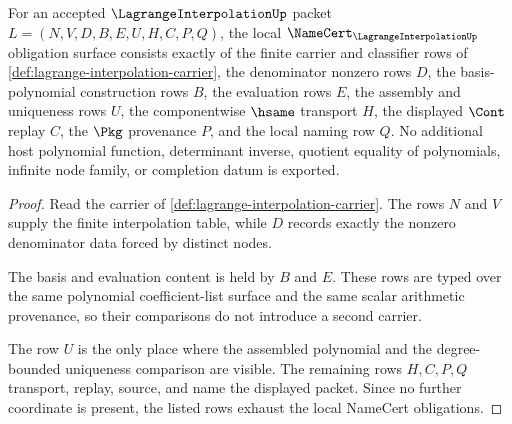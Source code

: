 \begin{theorem}
\label{thm:lagrange-interpolation-namecert-obligations}
For an accepted $\LagrangeInterpolationUp$ packet
$L=(N,V,D,B,E,U,H,C,P,Q)$, the local
$\NameCert_{\LagrangeInterpolationUp}$ obligation surface consists exactly of
the finite carrier and classifier rows of
\autoref{def:lagrange-interpolation-carrier}, the denominator nonzero rows
$D$, the basis-polynomial construction rows $B$, the evaluation rows $E$, the
assembly and uniqueness rows $U$, the componentwise $\hsame$ transport $H$, the
displayed $\Cont$ replay $C$, the $\Pkg$ provenance $P$, and the local naming
row $Q$. No additional host polynomial function, determinant inverse, quotient
equality of polynomials, infinite node family, or completion datum is exported.
\end{theorem}
\begin{proof}
Read the carrier of \autoref{def:lagrange-interpolation-carrier}. The rows
$N$ and $V$ supply the finite interpolation table, while $D$ records exactly
the nonzero denominator data forced by distinct nodes.

The basis and evaluation content is held by $B$ and $E$. These rows are typed
over the same polynomial coefficient-list surface and the same scalar
arithmetic provenance, so their comparisons do not introduce a second carrier.

The row $U$ is the only place where the assembled polynomial and the
degree-bounded uniqueness comparison are visible. The remaining rows $H,C,P,Q$
transport, replay, source, and name the displayed packet. Since no further
coordinate is present, the listed rows exhaust the local NameCert obligations.
\end{proof}

